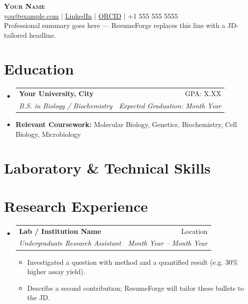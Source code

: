 \documentclass[letterpaper,10pt]{article}
\makeatletter
\newcommand{\resumeItem}[1]{
  \item{\small\setlength{\baselineskip}{10pt} #1 \vspace{-2pt}}
}
\newcommand{\resumeSubheading}[4]{
  \vspace{-2pt}\item
    \begin{tabular*}{\textwidth}[t]{@{}p{0.75\textwidth}@{\extracolsep{\fill}}r@{}}
      \textbf{#1} & \small #2 \\
      \textit{\small#3} & \textit{\small #4} \\
    \end{tabular*}\vspace{-4pt}
}
\newcommand{\resumeSubHeadingListStart}{\begin{itemize}[leftmargin=0in, label={}, topsep=0pt, partopsep=0pt]}
\newcommand{\resumeSubHeadingListEnd}{\end{itemize}}
\newcommand{\resumeItemListStart}{\begin{itemize}[leftmargin=0.15in, label={$\bullet$}, topsep=0pt, partopsep=0pt, itemsep=3pt, parsep=0pt]}
\newcommand{\resumeItemListEnd}{\end{itemize}}
\makeatother
\begin{document}
\fontsize{10.5}{11}\selectfont
\begin{center}
    {\Huge \scshape \textbf{Your Name}} \\ \vspace{4pt}
    \href{mailto:you@example.com}{\ul{you@example.com}} $|$
    \href{https://www.linkedin.com/in/your-handle/}{\ul{LinkedIn}} $|$
    \href{https://orcid.org/0000-0000-0000-0000}{\ul{ORCID}} $|$
    +1 555 555 5555 \\ \vspace{6pt}
    {Professional summary goes here — ResumeForge replaces this line with a JD-tailored headline.}
\end{center}
\section{Education}
\resumeSubHeadingListStart
  \resumeSubheading
    {Your University, City}{GPA: X.XX}
    {B.S. in Biology / Biochemistry}{\textit{Expected Graduation: Month Year}}  \vspace{-9pt}
  \item \small{\textbf{Relevant Coursework:} Molecular Biology, Genetics, Biochemistry, Cell Biology, Microbiology}
\resumeSubHeadingListEnd
\section{Laboratory \& Technical Skills}
\begin{itemize}[leftmargin=0in, label={}, topsep=0pt, partopsep=0pt]
  \small{\item{
  }}
\end{itemize}
\section{Research Experience}
\resumeSubHeadingListStart
  \resumeSubheading
    {Lab / Institution Name}{Location}
    {Undergraduate Research Assistant}{Month Year -- Month Year}
    \resumeItemListStart
      \resumeItem{Investigated a question with method and a quantified result (e.g. 30\% higher assay yield).}
      \resumeItem{Describe a second contribution; ResumeForge will tailor these bullets to the JD.}
    \resumeItemListEnd
\resumeSubHeadingListEnd
\end{document}
